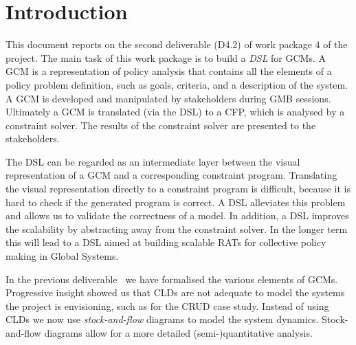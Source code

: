 \section{Introduction}\label{introduction}





This document reports on the second deliverable (D4.2) of work package 4 of the
\grace project. The main task of this work package is to build a \emph{\ac{DSL}}
for \acp{GCM}. A \ac{GCM} is a representation of policy analysis that contains
all the elements of a policy problem definition, such as goals, criteria, and
  a description of the system. A \ac{GCM} is developed and manipulated by
stakeholders during \ac{GMB} sessions. Ultimately a \ac{GCM} is translated
(via the \ac{DSL}) to a \ac{CFP}, which is analysed by a constraint solver. The
results of the constraint solver are presented to the stakeholders.

The \ac{DSL} can be regarded as an intermediate layer between the visual
representation of a \acf{GCM} and a corresponding constraint program.
Translating the visual representation directly to a constraint program is
difficult, because it is hard to check if the generated program is correct. A
DSL alleviates this problem and allows us to validate the correctness of a model. In
addition, a \ac{DSL} improves the scalability by abstracting away from the
constraint solver. In the longer term this will lead to a \ac{DSL} aimed at
building scalable \acp{RAT} for collective policy making in Global Systems.


In the previous deliverable~\cite{d4.1} we have formalised the various elements
of \acp{GCM}. Progressive insight showed us that \acp{CLD} are not
adequate to model the systems the project is envisioning, such as for the \ac{CRUD}
case study. Instead of using \aclp{CLD} we now use
\emph{stock-and-flow} diagrams to model the system dynamics. Stock-and-flow
diagrams allow for a more detailed (semi-)quantitative analysis.


